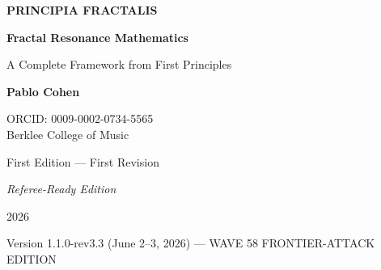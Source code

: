 \begin{titlepage}
\centering
\vspace*{2cm}

{\Huge\bfseries PRINCIPIA FRACTALIS}

\vspace{0.8cm}

{\huge\bfseries Fractal Resonance Mathematics}

\vspace{1cm}

{\LARGE A Complete Framework from First Principles}

\vspace{2cm}

{\Large\textbf{Pablo Cohen}}

\vspace{0.5cm}

{\large
ORCID: 0009-0002-0734-5565\\
Berklee College of Music
}

\vspace{2cm}


\vfill

{\large First Edition --- First Revision}

\vspace{0.3cm}

{\normalsize \textit{Referee-Ready Edition}}

\vspace{0.5cm}

{\large 2026}

\vspace{1cm}

{\normalsize Version 1.1.0-rev3.3 (June 2--3, 2026) --- WAVE 58 FRONTIER-ATTACK EDITION}

\end{titlepage}

